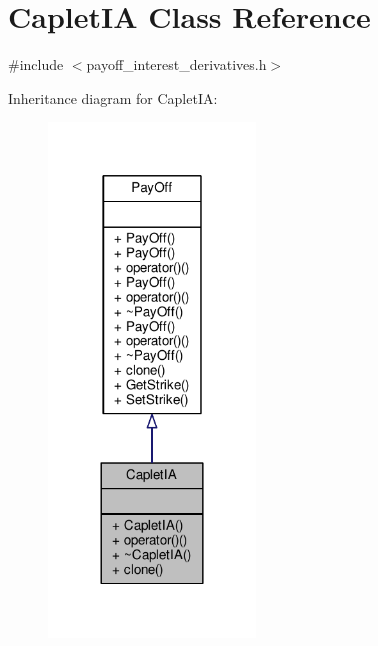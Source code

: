 \hypertarget{classCapletIA}{}\section{Caplet\+IA Class Reference}
\label{classCapletIA}


{\ttfamily \#include $<$payoff\+\_\+interest\+\_\+derivatives.\+h$>$}



Inheritance diagram for Caplet\+IA\+:
\nopagebreak
\begin{figure}[H]
\begin{center}
\leavevmode
\includegraphics[width=156pt]{classCapletIA__inherit__graph}
\end{center}
\end{figure}


